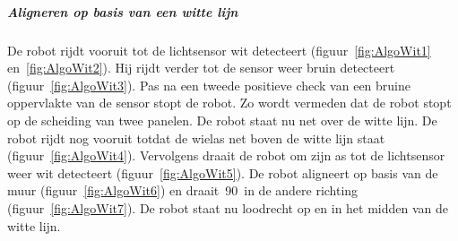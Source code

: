 \documentclass[tt3]{penoverslag}
\begin{document}
\subparagraph{Aligneren op basis van een witte lijn}
De robot rijdt vooruit tot de lichtsensor wit detecteert (figuur~\ref{fig:AlgoWit1} en~\ref{fig:AlgoWit2}). Hij rijdt verder tot de sensor weer bruin detecteert (figuur~\ref{fig:AlgoWit3}). Pas na een tweede positieve check van een bruine oppervlakte van de sensor stopt de robot. Zo wordt vermeden dat de robot stopt op de scheiding van twee panelen. De robot staat nu net over de witte lijn. De robot rijdt nog vooruit totdat de wielas net boven de witte lijn staat (figuur~\ref{fig:AlgoWit4}). Vervolgens draait de robot om zijn as tot de lichtsensor weer wit detecteert (figuur~\ref{fig:AlgoWit5}). De robot aligneert op basis van de muur (figuur~\ref{fig:AlgoWit6}) en draait~90\degree~in de andere richting (figuur~\ref{fig:AlgoWit7}). De robot staat nu loodrecht op en in het midden van de witte lijn.
\end{document}
